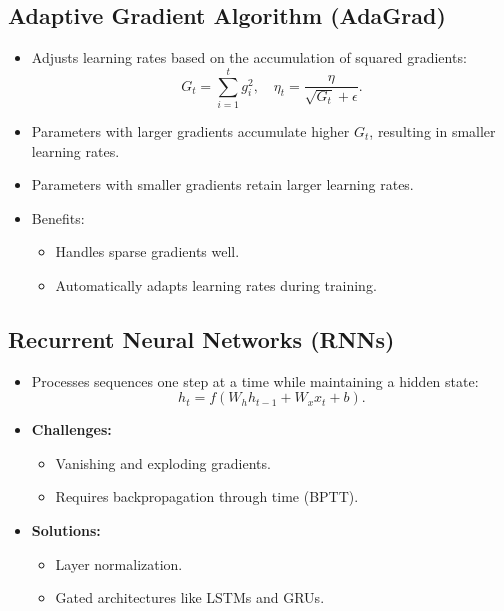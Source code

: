 \documentclass[12pt,a4paper]{article}
\begin{document}
\subsection{Adaptive Gradient Algorithm (AdaGrad)}
\begin{itemize}
    \item Adjusts learning rates based on the accumulation of squared gradients:
    \[ G_t = \sum_{i=1}^t g_i^2, \quad \eta_t = \frac{\eta}{\sqrt{G_t} + \epsilon}. \]
    \item Parameters with larger gradients accumulate higher $G_t$, resulting in smaller learning rates.
    \item Parameters with smaller gradients retain larger learning rates.
    \item Benefits:
    \begin{itemize}
        \item Handles sparse gradients well.
        \item Automatically adapts learning rates during training.
    \end{itemize}
\end{itemize}

\subsection{Recurrent Neural Networks (RNNs)}
\begin{itemize}
    \item Processes sequences one step at a time while maintaining a hidden state:
    \[ h_t = f(W_h h_{t-1} + W_x x_t + b). \]
    \item \textbf{Challenges:}
    \begin{itemize}
        \item Vanishing and exploding gradients.
        \item Requires backpropagation through time (BPTT).
    \end{itemize}
    \item \textbf{Solutions:}
    \begin{itemize}
        \item Layer normalization.
        \item Gated architectures like LSTMs and GRUs.
    \end{itemize}
\end{itemize}
\end{document}
